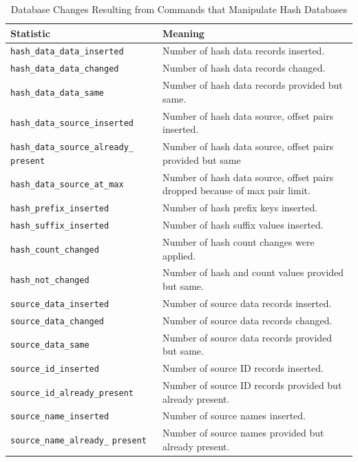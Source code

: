 \documentclass[11pt,fleqn]{article} %
\begin{document}
\begin{table}[!ht]
\centering
\caption{Database Changes Resulting from Commands that Manipulate Hash Databases}
\label{tab:changeStatistics}
\begin{tabular}{|p{5 cm}|p{8.8 cm}|}
\hline \hline
\textbf{Statistic} & \textbf{Meaning} \\
\hline

\verb+hash_data_data_inserted+ &  Number of hash data records inserted.\\
\hline
\verb+hash_data_data_changed+ &  Number of hash data records changed.\\
\hline
\verb+hash_data_data_same+ &  Number of hash data records provided but same.\\
\hline
\verb+hash_data_source_inserted+ &  Number of hash data source, offset pairs inserted.\\
\hline
\verb+hash_data_source_already_+ \verb+present+ &  Number of hash data source, offset pairs provided but same\\
\hline
\verb+hash_data_source_at_max+ &  Number of hash data source, offset pairs dropped because of max pair limit.\\
\hline

\verb+hash_prefix_inserted+ &  Number of hash prefix keys inserted.\\
\hline
\verb+hash_suffix_inserted+ &  Number of hash suffix values inserted.\\
\hline
\verb+hash_count_changed+ &  Number of hash count changes were applied.\\
\hline
\verb+hash_not_changed+ &  Number of hash and count values provided but same.\\
\hline

\verb+source_data_inserted+ &  Number of source data records inserted.\\
\hline
\verb+source_data_changed+ &  Number of source data records changed.\\
\hline
\verb+source_data_same+ &  Number of source data records provided but same.\\
\hline

\verb+source_id_inserted+ &  Number of source ID records inserted.\\
\hline
\verb+source_id_already_present+ &  Number of source ID records provided but already present.\\
\hline

\verb+source_name_inserted+ &  Number of source names inserted.\\
\hline
\verb+source_name_already_+ \verb+present+ &  Number of source names provided but already present.\\
\hline
\end{tabular}
\end{table}
\end{document}

